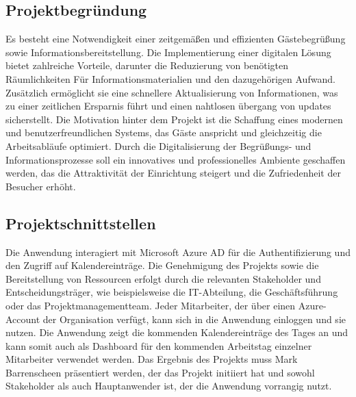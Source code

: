 \subsection{Projektbegründung} 
\label{sec:Projektbegruendung}
Es besteht eine Notwendigkeit einer zeitgemäßen und effizienten Gästebegrüßung sowie Informationsbereitstellung.
Die Implementierung einer digitalen Lösung bietet zahlreiche Vorteile, darunter die Reduzierung von benötigten Räumlichkeiten Für Informationsmaterialien und den dazugehörigen Aufwand.
Zusätzlich ermöglicht sie eine schnellere Aktualisierung von Informationen, was zu einer zeitlichen Ersparnis führt und einen nahtlosen übergang von updates sicherstellt.
Die Motivation hinter dem Projekt ist die Schaffung eines modernen und benutzerfreundlichen Systems, das Gäste anspricht und gleichzeitig die Arbeitsabläufe optimiert.
Durch die Digitalisierung der Begrüßungs- und Informationsprozesse soll ein innovatives und professionelles Ambiente geschaffen werden, das die Attraktivität der Einrichtung steigert und die Zufriedenheit der Besucher erhöht.


\subsection{Projektschnittstellen} 
\label{sec:Projektschnittstellen}
Die Anwendung interagiert mit Microsoft Azure AD für die Authentifizierung und den Zugriff auf Kalendereinträge.
Die Genehmigung des Projekts sowie die Bereitstellung von Ressourcen erfolgt durch die relevanten Stakeholder und Entscheidungsträger, wie beispielsweise die IT-Abteilung, die Geschäftsführung oder das Projektmanagementteam.
Jeder Mitarbeiter, der über einen Azure-Account der Organisation verfügt, kann sich in die Anwendung einloggen und sie nutzen.
Die Anwendung zeigt die kommenden Kalendereinträge des Tages an und kann somit auch als Dashboard für den kommenden Arbeitstag einzelner Mitarbeiter verwendet werden.
Das Ergebnis des Projekts muss Mark Barrenscheen präsentiert werden, der das Projekt initiiert hat und sowohl Stakeholder als auch Hauptanwender ist, der die Anwendung vorrangig nutzt.

